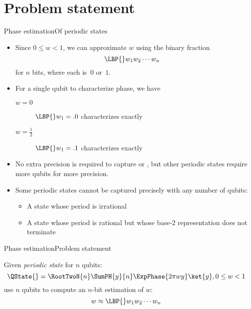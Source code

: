\section*{Problem statement}
\begin{frame}{Phase estimation}{Of periodic states}

\begin{itemize}[<+->]
    \item Since $0\leq w < 1$, we can approximate $w$ using the binary fraction
    \[ \LBP{}w_{1}w_{2}\cdots w_{n}\]
    for $n$ bits, where each is~$0$ or~$1$.
    \item For a single qubit to characterize phase, we have
    \begin{description}
        \item[$w=0$]  $\LBP{}w_{1}=.0$ characterizes \ket{+} exactly
        \item[$w=\frac{1}{2}$] $\LBP{}w_{1}=.1$ characterizes \ket{-} exactly
    \end{description}
    \item No extra precision is required to capture \ket{+} or \ket{-}, but other periodic states require more qubits for more precision.
    \item Some periodic states cannot be captured precisely with any number of qubits:
    \begin{itemize}
        \item A state whose period is irrational
        \item A state whose period is rational but whose base-$2$ representation does not terminate
    \end{itemize}
\end{itemize}
    
\end{frame}

\begin{frame}{Phase estimation}{Problem statement}

Given \emph{periodic state} \QState{} for $n$ qubits: 
\[
\QState{} = \RootTwoN{n}\SumPH{y}{n} \ExpPhase{2\pi wy} \ket{y},  0 \leq w < 1
\]
use $n$ qubits to compute an $n$-bit estimation of $w$:
\[
w \approx \LBP{}w_{1}w_{2}\cdots w_{n} 
\]
    
\end{frame}

